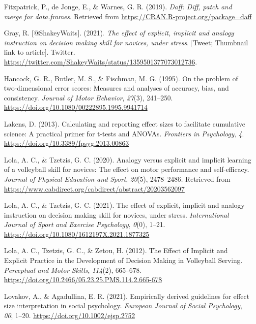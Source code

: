 \documentclass[
  english,
  man, donotrepeattitle,floatsintext]{apa7}
\newlength{\cslhangindent}
\newlength{\cslentryspacingunit} %
\newenvironment{CSLReferences}[2] %
 {%
  \setlength{\parindent}{0pt}
  \ifodd #1
  \let\oldpar\par
  \def\par{\hangindent=\cslhangindent\oldpar}
  \fi
  \setlength{\parskip}{#2\cslentryspacingunit}
 }%
 {}
\begin{document}
\begin{CSLReferences}{1}{0}
\leavevmode{}%
Fitzpatrick, P., de Jonge, E., \& Warnes, G. R. (2019). \emph{Daff: Diff, patch and merge for data.frames}. Retrieved from \url{https://CRAN.R-project.org/package=daff}

\leavevmode{}%
Gray, R. {[}@ShakeyWaits{]}. (2021). \emph{The effect of explicit, implicit and analogy instruction on decision making skill for novices, under stress}. {[}Tweet; Thumbnail link to article{]}. Twitter. \url{https://twitter.com/ShakeyWaits/status/1359501377073012736}.

\leavevmode{}%
Hancock, G. R., Butler, M. S., \& Fischman, M. G. (1995). On the problem of two-dimensional error scores: Measures and analyses of accuracy, bias, and consistency. \emph{Journal of Motor Behavior}, \emph{27}(3), 241--250. \url{https://doi.org/10.1080/00222895.1995.9941714}

\leavevmode{}%
Lakens, D. (2013). Calculating and reporting effect sizes to facilitate cumulative science: A practical primer for t-tests and ANOVAs. \emph{Frontiers in Psychology}, \emph{4}. \url{https://doi.org/10.3389/fpsyg.2013.00863}

\leavevmode{}%
Lola, A. C., \& Tzetzis, G. C. (2020). Analogy versus explicit and implicit learning of a volleyball skill for novices: The effect on motor performance and self-efficacy. \emph{Journal of Physical Education and Sport}, \emph{20}(5), 2478--2486. Retrieved from \url{https://www.cabdirect.org/cabdirect/abstract/20203562097}

\leavevmode{}%
Lola, A. C., \& Tzetzis, G. C. (2021). The effect of explicit, implicit and analogy instruction on decision making skill for novices, under stress. \emph{International Journal of Sport and Exercise Psychology}, \emph{0}(0), 1--21. \url{https://doi.org/10.1080/1612197X.2021.1877325}

\leavevmode{}%
Lola, A. C., Tzetzis, G. C., \& Zetou, H. (2012). The Effect of Implicit and Explicit Practice in the Development of Decision Making in Volleyball Serving. \emph{Perceptual and Motor Skills}, \emph{114}(2), 665--678. \url{https://doi.org/10.2466/05.23.25.PMS.114.2.665-678}

\leavevmode{}%
Lovakov, A., \& Agadullina, E. R. (2021). Empirically derived guidelines for effect size interpretation in social psychology. \emph{European Journal of Social Psychology}, \emph{00}, 1--20. \url{https://doi.org/10.1002/ejsp.2752}


\end{CSLReferences}
\end{document}
